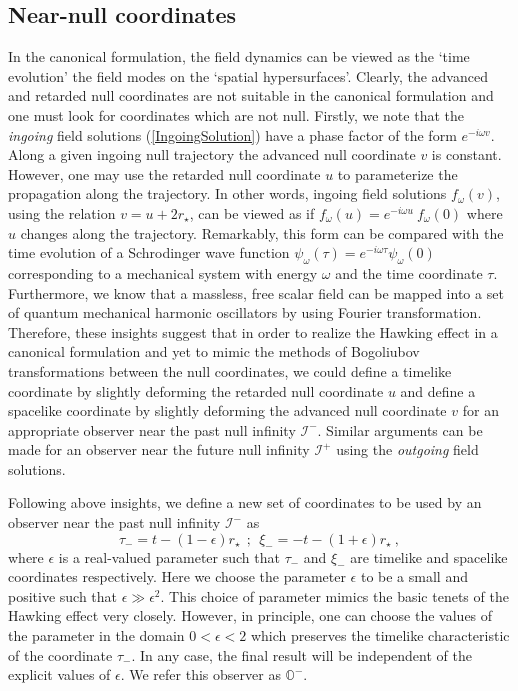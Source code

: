 \documentclass[aps,twocolumn,showpacs]{revtex4}
\def\rstar{r_{\star}}
\def\scriplus{\mathscr{I}^{+}}
\def\scriminus{\mathscr{I}^{-}}
\def\observerminus{\mathbb{O}^{-}}
\begin{document}
\subsection{Near-null coordinates}


In the canonical formulation, the field dynamics can be viewed as the `time 
evolution' the field modes on the `spatial hypersurfaces'. Clearly, the advanced 
and retarded null coordinates are not suitable in the canonical formulation and 
one must look for coordinates which are not null. Firstly, we note that the 
\emph{ingoing} field solutions (\ref{IngoingSolution}) have a phase factor of 
the form $e^{-i\omega v}$. Along a given ingoing null trajectory the advanced 
null coordinate $v$ is constant. However, one may use the retarded null 
coordinate $u$ to parameterize the propagation along the trajectory. In other 
words, ingoing field solutions ${f}_{\omega}(v)$, using the relation 
$v=u+2\rstar$, can be viewed as if ${f}_{\omega}(u) = e^{-i\omega u } 
~{f}_{\omega}(0)$ where $u$ changes along the trajectory. Remarkably, this form 
can be compared with the time evolution of a Schrodinger wave function 
$\psi_{\omega}(\tau) = e^{-i\omega\tau}\psi_{\omega}(0)$ corresponding to a 
mechanical system with energy $\omega$ and the time coordinate $\tau$. 
Furthermore, we know that a massless, free scalar field can be mapped into a set 
of quantum mechanical harmonic oscillators by using Fourier transformation. 
Therefore, these insights suggest that in order to realize the Hawking effect in 
a canonical formulation and yet to mimic the methods of Bogoliubov 
transformations between the null coordinates, we could define a timelike 
coordinate by slightly deforming the retarded null coordinate $u$ and define a  
spacelike coordinate by slightly deforming the advanced null coordinate $v$ for 
an appropriate observer near the past null infinity $\scriminus$. Similar 
arguments can be made for an observer near the future null infinity $\scriplus$ 
using the \emph{outgoing} field solutions.


Following above insights, we define a new set of coordinates to be used by an 
observer near the past null infinity $\scriminus$ as
%
\begin{equation}\label{NearNullCoordinatesMinus}
\tau_{-} = t - (1-\epsilon)\rstar ~~;~~ \xi_{-} = -t - (1+\epsilon)\rstar  ~,
\end{equation}
%
where $\epsilon$ is a real-valued parameter such that $\tau_{-}$ and $\xi_{-}$ 
are timelike and spacelike coordinates respectively. Here we choose the 
parameter $\epsilon$ to be a small and positive such that $\epsilon \gg 
\epsilon^2$. This choice of parameter mimics the basic tenets of the Hawking 
effect very closely. However, in principle, one can choose the values of the 
parameter in the domain $0<\epsilon<2$ which preserves the timelike 
characteristic of the coordinate $\tau_{-}$. In any case, the final result will 
be independent of the explicit values of $\epsilon$. We refer this observer as 
$\observerminus$. 
\end{document}
